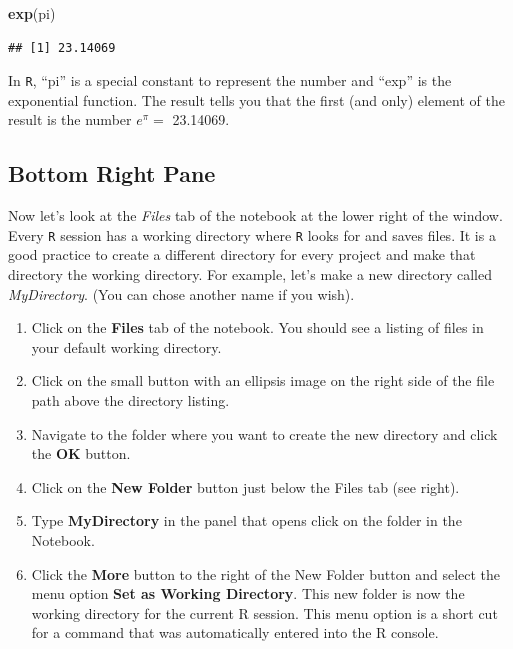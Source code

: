\documentclass[
]{book}
\newenvironment{Shaded}{\begin{snugshade}}{\end{snugshade}}
\newcommand{\KeywordTok}[1]{\textcolor[rgb]{0.13,0.29,0.53}{\textbf{#1}}}
\newcommand{\NormalTok}[1]{#1}
\begin{document}
\begin{Shaded}
\begin{Highlighting}[]
\KeywordTok{exp}\NormalTok{(pi)}
\end{Highlighting}
\end{Shaded}

\begin{verbatim}
## [1] 23.14069
\end{verbatim}

In \texttt{R}, ``pi'' is a special constant to represent the number and ``exp'' is the exponential function. The result tells you that the first (and only) element of the result is the number \(e^{\pi}=\) 23.14069.

\hypertarget{bottom-right-pane}{%
\subsection*{Bottom Right Pane}\label{bottom-right-pane}}

Now let's look at the \emph{Files} tab of the notebook at the lower right of the window. Every \texttt{R} session has a working directory where \texttt{R} looks for and saves files. It is a good practice to create a different directory for every project and make that directory the working directory. For example, let's make a new directory called \emph{MyDirectory}. (You can chose another name if you wish).

\begin{enumerate}
\def\labelenumi{\arabic{enumi})}
\item
  Click on the \textbf{Files} tab of the notebook. You should see a listing of files in your default working directory.
\item
  Click on the small button with an ellipsis image on the right side of the file path above the directory listing.
\item
  Navigate to the folder where you want to create the new directory and click the \textbf{OK} button.
\item
  Click on the \textbf{New Folder} button just below the Files tab (see right).
\item
  Type \textbf{MyDirectory} in the panel that opens click on the folder in the Notebook.
\item
  Click the \textbf{More} button to the right of the New Folder button and select the menu option \textbf{Set as Working Directory}. This new folder is now the working directory for the current R session. This menu option is a short cut for a command that was automatically entered into the R console.
\end{enumerate}
\end{document}
